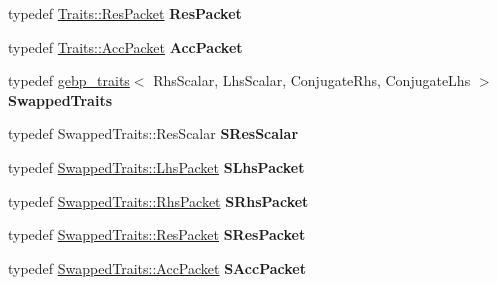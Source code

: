 \begin{DoxyCompactItemize}
typedef \hyperlink{class_eigen_1_1internal_1_1_tensor_lazy_evaluator_writable}{Traits\+::\+Res\+Packet} {\bfseries Res\+Packet}
\item 
\mbox{\label{struct_eigen_1_1internal_1_1gebp__kernel_ad591096b11aea803742dd4482e46961a}} 
typedef \hyperlink{class_eigen_1_1internal_1_1_tensor_lazy_evaluator_writable}{Traits\+::\+Acc\+Packet} {\bfseries Acc\+Packet}
\item 
\mbox{\label{struct_eigen_1_1internal_1_1gebp__kernel_a9793d170707e854eb15e26f27236de8d}} 
typedef \hyperlink{class_eigen_1_1internal_1_1gebp__traits}{gebp\+\_\+traits}$<$ Rhs\+Scalar, Lhs\+Scalar, Conjugate\+Rhs, Conjugate\+Lhs $>$ {\bfseries Swapped\+Traits}
\item 
\mbox{\label{struct_eigen_1_1internal_1_1gebp__kernel_a91134d92cfbc82bccc82836d0589c78a}} 
typedef Swapped\+Traits\+::\+Res\+Scalar {\bfseries S\+Res\+Scalar}
\item 
\mbox{\label{struct_eigen_1_1internal_1_1gebp__kernel_ac6d9a01a6cd5336e08b07c58efee44b6}} 
typedef \hyperlink{class_eigen_1_1internal_1_1_tensor_lazy_evaluator_writable}{Swapped\+Traits\+::\+Lhs\+Packet} {\bfseries S\+Lhs\+Packet}
\item 
\mbox{\label{struct_eigen_1_1internal_1_1gebp__kernel_a6a1a2ff6e30bb70ed43572392dd0530a}} 
typedef \hyperlink{class_eigen_1_1internal_1_1_tensor_lazy_evaluator_writable}{Swapped\+Traits\+::\+Rhs\+Packet} {\bfseries S\+Rhs\+Packet}
\item 
\mbox{\label{struct_eigen_1_1internal_1_1gebp__kernel_a0c4a0b1397b0fe4fc66acd81e87fd614}} 
typedef \hyperlink{class_eigen_1_1internal_1_1_tensor_lazy_evaluator_writable}{Swapped\+Traits\+::\+Res\+Packet} {\bfseries S\+Res\+Packet}
\item 
\mbox{\label{struct_eigen_1_1internal_1_1gebp__kernel_a32e53eb27c3a5b3fe752036a608aab30}} 
typedef \hyperlink{class_eigen_1_1internal_1_1_tensor_lazy_evaluator_writable}{Swapped\+Traits\+::\+Acc\+Packet} {\bfseries S\+Acc\+Packet}

\end{DoxyCompactItemize}
